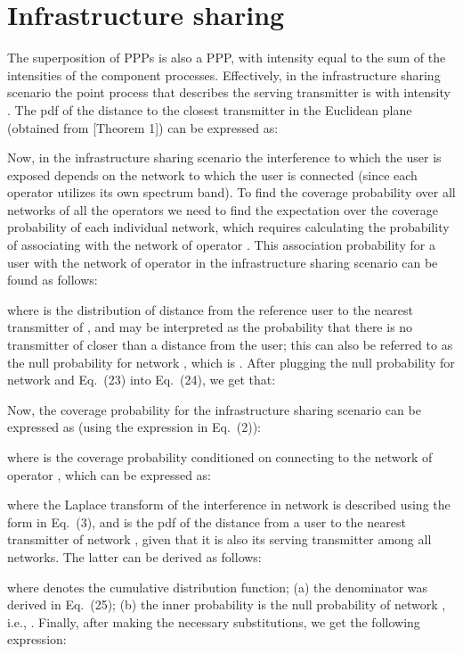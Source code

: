 \documentclass[12pt, journal,doublecolumn, final]{IEEEtran}
\begin{document}
\appendices

\section{Infrastructure sharing}
\label{app:infrastructure_sharing}

The superposition of \acp{PPP} is also a \ac{PPP}, with intensity equal to the sum of the intensities of the component processes. Effectively, in the infrastructure sharing scenario the point process that describes the serving transmitter is  with intensity . The \ac{pdf} of the distance to the closest transmitter in the Euclidean plane (obtained from \cite{Haenggi_2005}[Theorem 1]) can be expressed as:
 

Now, in the infrastructure sharing scenario the interference to which the user is exposed depends on the network to which the user is connected (since each operator utilizes its own spectrum band). To find the coverage probability over all networks of all the operators we need to find the expectation over the coverage probability of each individual network, which requires calculating the probability of associating with the network of operator . This association probability for a user with the network of operator  in the infrastructure sharing scenario can be found as follows:

where  is the distribution of distance from the reference user to the nearest transmitter of , and  may be interpreted as the probability that there is no transmitter of  closer than a distance  from the user; this can also be referred to as the null probability for network , which is . After plugging the null probability for network  and Eq.~(23) into Eq.~(24), we get that:


Now, the coverage probability for the infrastructure sharing scenario can be expressed as (using the expression in Eq.~(2)):

where  is the coverage probability conditioned on connecting to the network of operator , which can be expressed as:

where the Laplace transform  of the interference in network  is described using the form in Eq.~(3), and 
 is the \ac{pdf} of the distance from a user to the nearest transmitter of network , given that it is also its serving transmitter among all networks. The latter can be derived as follows:

where  denotes the cumulative distribution function; (a) the denominator was derived in Eq.~(25); (b) the inner probability is the null probability of network , i.e., . Finally, after making the necessary substitutions, we get the following expression:
\end{document}
